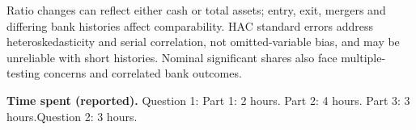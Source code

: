 \documentclass[10pt]{article}
\begin{document}
Ratio changes can reflect either cash or total assets; entry, exit, mergers and differing bank histories affect comparability. HAC standard errors address heteroskedasticity and serial correlation, not omitted-variable bias, and may be unreliable with short histories. Nominal significant shares also face multiple-testing concerns and correlated bank outcomes.
\par\smallskip
{\small\textbf{Time spent (reported).} Question 1: Part 1: 2 hours. Part 2: 4 hours. Part 3: 3 hours.\quad Question 2: 3 hours.}
\end{document}
